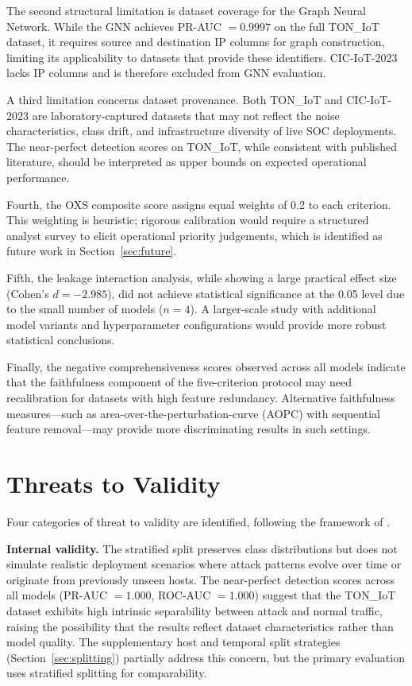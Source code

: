 \documentclass[12pt,a4paper]{report}
\begin{document}
The second structural limitation is dataset coverage for the Graph Neural Network. While the GNN achieves PR-AUC $= 0.9997$ on the full TON\_IoT dataset, it requires source and destination IP columns for graph construction, limiting its applicability to datasets that provide these identifiers. CIC-IoT-2023 lacks IP columns and is therefore excluded from GNN evaluation.

A third limitation concerns dataset provenance. Both TON\_IoT and CIC-IoT-2023 are laboratory-captured datasets that may not reflect the noise characteristics, class drift, and infrastructure diversity of live SOC deployments. The near-perfect detection scores on TON\_IoT, while consistent with published literature, should be interpreted as upper bounds on expected operational performance.

Fourth, the OXS composite score assigns equal weights of 0.2 to each criterion. This weighting is heuristic; rigorous calibration would require a structured analyst survey to elicit operational priority judgements, which is identified as future work in Section~\ref{sec:future}.

Fifth, the leakage interaction analysis, while showing a large practical effect size (Cohen's $d = -2.985$), did not achieve statistical significance at the 0.05 level due to the small number of models ($n = 4$). A larger-scale study with additional model variants and hyperparameter configurations would provide more robust statistical conclusions.

Finally, the negative comprehensiveness scores observed across all models indicate that the faithfulness component of the five-criterion protocol may need recalibration for datasets with high feature redundancy. Alternative faithfulness measures---such as area-over-the-perturbation-curve (AOPC) with sequential feature removal---may provide more discriminating results in such settings.

\section{Threats to Validity}
\label{sec:threats}

Four categories of threat to validity are identified, following the framework of \citet{deyoung2020}.

\textbf{Internal validity.} The stratified split preserves class distributions but does not simulate realistic deployment scenarios where attack patterns evolve over time or originate from previously unseen hosts. The near-perfect detection scores across all models (PR-AUC $= 1.000$, ROC-AUC $= 1.000$) suggest that the TON\_IoT dataset exhibits high intrinsic separability between attack and normal traffic, raising the possibility that the results reflect dataset characteristics rather than model quality. The supplementary host and temporal split strategies (Section~\ref{sec:splitting}) partially address this concern, but the primary evaluation uses stratified splitting for comparability.
\end{document}
